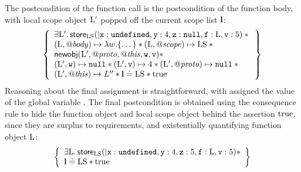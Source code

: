 \documentclass{article}
\begin{document}
The postcondition of the function call is the postcondition of the function body, with local scope object ${\mathrm{L}}'$ popped off the current scope list $\textbf{l}$:
\[
      \left\{\begin{array}{l}
              \exists{\ensuremath{\mathrm{L}}}' \mathpunct{.} 
              \mathsf{store}_{{\mathrm{LS}}}(|\mbox{\texttt{{\upshape x}}}:\mbox{\texttt{{\upshape undefined}}},\mbox{\texttt{{\upshape y}}}:4,\mbox{\texttt{{\upshape z}}}:\mbox{\texttt{{\upshape null}}},\mbox{\texttt{{\upshape f}}}:{\mathrm{L}},\mbox{\texttt{{\upshape v}}}:5) \mathbin{*} {}\\
               ({\mathrm{L}},\mathit{@body})\mapsto \lambda w.\{\dots\}\mathbin{*}
               ({\mathrm{L}},\mathit{@scope})\mapsto {\ensuremath{\mathrm{LS}}}  \mathbin{*} {} \\
               \mathsf{newobj}({\mathrm{L}}',\mathit{@proto},\mathit{@this},\mbox{\texttt{{\upshape w}}},\mbox{\texttt{{\upshape v}}})\mathbin{*} \\
               ({\mathrm{L}}',\mbox{\texttt{{\upshape w}}})\mapsto\mbox{\texttt{{\upshape null}}} \mathbin{*} 
               ({\mathrm{L}}',\mbox{\texttt{{\upshape v}}})\mapsto 4\mathbin{*}
               ({\mathrm{L}}',\mathit{@proto})\mapsto \mbox{\texttt{{\upshape null}}} \mathbin{*}{}   \\
               ({\mathrm{L}}',\mathit{@this})\mapsto L''\mathbin{*}\textbf{l}\doteq{\ensuremath{\mathrm{LS}}}\mathbin{*}{\mathrm{true}}
       \end{array}\right\}
\]
Reasoning about the final assignment is straightforward, with  assigned the value of the global variable . The
final postcondition is obtained using the consequence rule to hide the  function object and  local scope object behind the assertion ${\mathrm{true}}$, since they are surplus to requirements, and existentially quantifying  function object ${\mathrm{L}}$: 
\[\begin{array}{c}
        \left\{\begin{array}{l}
                \exists \V{L} \st 
                \store_{\V{LS}}(|\js{x}:\und,\js{y}:4,\js{z}:5,\js{f}:\V{L},\js{v}:5)
                \sep\\
                \ls\doteq\V{LS}\sep\true
        \end{array}\right\}%
\end{array}\]
\end{document}
